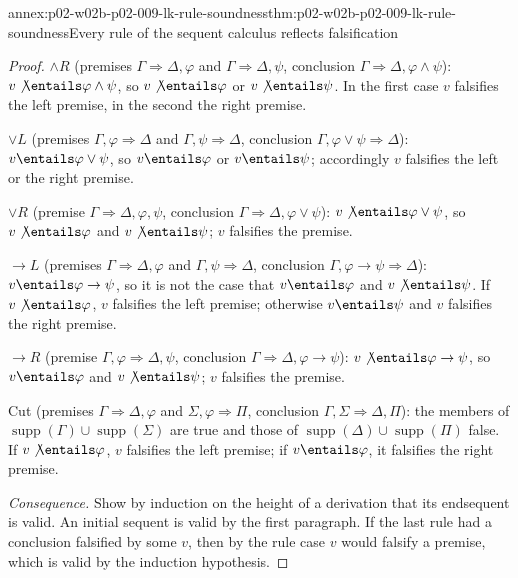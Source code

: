 \begin{annexitem}{annex:p02-w02b-p02-009-lk-rule-soundness}{thm:p02-w02b-p02-009-lk-rule-soundness}{Every rule of the sequent calculus reflects falsification}
\begin{proof}
\(\land R\) (premises \(\Gamma\Rightarrow\Delta,\varphi\) and
\(\Gamma\Rightarrow\Delta,\psi\), conclusion
\(\Gamma\Rightarrow\Delta,\varphi\land\psi\)):
\(v\not\entails\varphi\land\psi\), so \(v\not\entails\varphi\) or
\(v\not\entails\psi\).  In the first case \(v\) falsifies the left premise,
in the second the right premise.

\(\lor L\) (premises \(\Gamma,\varphi\Rightarrow\Delta\) and
\(\Gamma,\psi\Rightarrow\Delta\), conclusion
\(\Gamma,\varphi\lor\psi\Rightarrow\Delta\)): \(v\entails\varphi\lor\psi\),
so \(v\entails\varphi\) or \(v\entails\psi\); accordingly \(v\) falsifies the
left or the right premise.

\(\lor R\) (premise \(\Gamma\Rightarrow\Delta,\varphi,\psi\), conclusion
\(\Gamma\Rightarrow\Delta,\varphi\lor\psi\)):
\(v\not\entails\varphi\lor\psi\), so \(v\not\entails\varphi\) and
\(v\not\entails\psi\); \(v\) falsifies the premise.

\(\to L\) (premises \(\Gamma\Rightarrow\Delta,\varphi\) and
\(\Gamma,\psi\Rightarrow\Delta\), conclusion
\(\Gamma,\varphi\to\psi\Rightarrow\Delta\)): \(v\entails\varphi\to\psi\), so
it is not the case that \(v\entails\varphi\) and \(v\not\entails\psi\).  If
\(v\not\entails\varphi\), \(v\) falsifies the left premise; otherwise
\(v\entails\psi\) and \(v\) falsifies the right premise.

\(\to R\) (premise \(\Gamma,\varphi\Rightarrow\Delta,\psi\), conclusion
\(\Gamma\Rightarrow\Delta,\varphi\to\psi\)):
\(v\not\entails\varphi\to\psi\), so \(v\entails\varphi\) and
\(v\not\entails\psi\); \(v\) falsifies the premise.

Cut (premises \(\Gamma\Rightarrow\Delta,\varphi\) and
\(\Sigma,\varphi\Rightarrow\Pi\), conclusion
\(\Gamma,\Sigma\Rightarrow\Delta,\Pi\)): the members of
\(\operatorname{supp}(\Gamma)\cup\operatorname{supp}(\Sigma)\) are true and
those of \(\operatorname{supp}(\Delta)\cup\operatorname{supp}(\Pi)\) false.
If \(v\not\entails\varphi\), \(v\) falsifies the left premise; if
\(v\entails\varphi\), it falsifies the right premise.

\emph{Consequence.}  Show by induction on the height of a derivation that its
endsequent is valid.  An initial sequent is valid by the first paragraph.  If
the last rule had a conclusion falsified by some \(v\), then by the rule case
\(v\) would falsify a premise, which is valid by the induction hypothesis.
\end{proof}
\end{annexitem}

